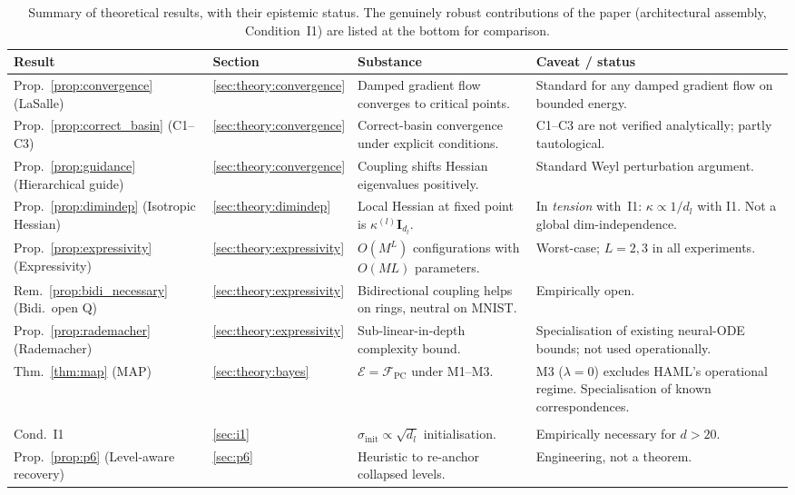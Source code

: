 \documentclass[11pt,a4paper]{article}
\begin{document}
\begin{table}[h]
\centering
\footnotesize
\setlength{\tabcolsep}{4pt}
\begin{tabular}{p{2.3cm}lp{4cm}p{4.3cm}}
\toprule
\textbf{Result} & \textbf{Section} & \textbf{Substance} & \textbf{Caveat / status} \\
\midrule
Prop.~\ref{prop:convergence} (LaSalle) & \ref{sec:theory:convergence} & Damped gradient flow converges to critical points. & Standard for any damped gradient flow on bounded energy. \\
\addlinespace
Prop.~\ref{prop:correct_basin} (C1--C3) & \ref{sec:theory:convergence} & Correct-basin convergence under explicit conditions. & C1--C3 are not verified analytically; partly tautological. \\
\addlinespace
Prop.~\ref{prop:guidance} (Hierarchical guide) & \ref{sec:theory:convergence} & Coupling shifts Hessian eigenvalues positively. & Standard Weyl perturbation argument. \\
\addlinespace
Prop.~\ref{prop:dimindep} (Isotropic Hessian) & \ref{sec:theory:dimindep} & Local Hessian at fixed point is $\kappa^{(l)}\mathbf{I}_{d_l}$. & In \emph{tension} with~I1: $\kappa \propto 1/d_l$ with I1. Not a global dim-independence. \\
\addlinespace
Prop.~\ref{prop:expressivity} (Expressivity) & \ref{sec:theory:expressivity} & $O(M^L)$ configurations with $O(ML)$ parameters. & Worst-case; $L=2,3$ in all experiments. \\
\addlinespace
Rem.~\ref{prop:bidi_necessary} (Bidi.\ open Q) & \ref{sec:theory:expressivity} & Bidirectional coupling helps on rings, neutral on MNIST. & Empirically open. \\
\addlinespace
Prop.~\ref{prop:rademacher} (Rademacher) & \ref{sec:theory:expressivity} & Sub-linear-in-depth complexity bound. & Specialisation of existing neural-ODE bounds; not used operationally. \\
\addlinespace
Thm.~\ref{thm:map} (MAP) & \ref{sec:theory:bayes} & $\mathcal{E} = \mathcal{F}_{\mathrm{PC}}$ under M1--M3. & M3 ($\lambda=0$) excludes HAML's operational regime. Specialisation of known correspondences. \\
\addlinespace
\midrule
\multicolumn{4}{l}{\emph{Non-theoretical contributions (the more robust ones):}} \\
\addlinespace
Cond.~I1 & \ref{sec:i1} & $\sigma_{\mathrm{init}} \propto \sqrt{d_l}$ initialisation. & Empirically necessary for $d > 20$. \\
\addlinespace
Prop.~\ref{prop:p6} (Level-aware recovery) & \ref{sec:p6} & Heuristic to re-anchor collapsed levels. & Engineering, not a theorem. \\
\bottomrule
\end{tabular}
\caption{Summary of theoretical results, with their epistemic status. The genuinely
robust contributions of the paper (architectural assembly, Condition~I1) are listed at
the bottom for comparison.}
\end{table}
\end{document}
